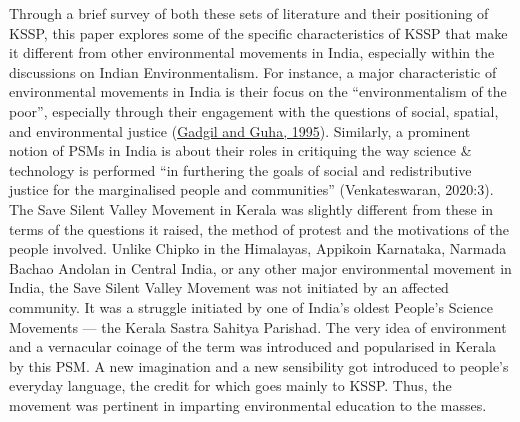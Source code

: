 \documentclass[twoside, 13pt]{article}
\begin{document}
\newpage
{\fontsize{12}{14}\selectfont Through a brief survey of both these sets of literature and their positioning of KSSP, this paper explores some of the specific characteristics of KSSP that make it different from other environmental movements in India, especially within the discussions on Indian Environmentalism. For instance, a major characteristic of environmental movements in India is their focus on the “environmentalism of the poor”, especially through their engagement with the questions of social, spatial, and environmental justice (\underline{Gadgil and Guha, 1995}). Similarly, a prominent notion of PSMs in India is about their roles in critiquing the way science \& technology is performed “in furthering the goals of social and redistributive justice for the marginalised people and communities” (Venkateswaran, 2020:3). The Save Silent Valley Movement in Kerala was slightly different from these in terms of the questions it raised, the method of protest and the motivations of the people involved. Unlike Chipko in the Himalayas, Appikoin Karnataka, Narmada Bachao Andolan in Central India, or any other major environmental movement in India, the Save Silent Valley Movement was not initiated by an affected community. It was a struggle initiated by one of India’s oldest People’s Science Movements — the Kerala Sastra Sahitya Parishad. The very idea of environment and a vernacular coinage of the term was introduced and popularised in Kerala by this PSM. A new imagination and a new sensibility got introduced to people’s everyday language, the credit for which goes mainly to KSSP. Thus, the movement was pertinent in imparting environmental education to the masses.}
\end{document}
